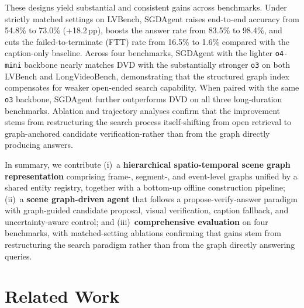 \documentclass[sigconf, screen, review, anonymous]{acmart}
\begin{document}

These designs yield substantial and consistent gains across benchmarks.
Under strictly matched settings on LVBench\cite{lvbench}, SGDAgent raises end-to-end accuracy from 54.8\% to 73.0\% (+18.2\,pp), boosts the answer rate from 83.5\% to 98.4\%, and cuts the failed-to-terminate (FTT) rate from 16.5\% to 1.6\% compared with the caption-only baseline.  Across four benchmarks, SGDAgent with the lighter \texttt{o4-mini} backbone nearly matches DVD\cite{deepvideo2025} with the substantially stronger \texttt{o3} on both LVBench and LongVideoBench\cite{longvideobench2024}, demonstrating that the structured graph index compensates for weaker open-ended search capability. When paired with the same \texttt{o3} backbone, SGDAgent further outperforms DVD on all three long-duration benchmarks.  Ablation and trajectory analyses confirm that the improvement stems from restructuring the search process itself-shifting from open retrieval to graph-anchored candidate verification-rather than from the graph directly producing answers.


In summary, we contribute (i)~a \textbf{hierarchical spatio-temporal scene
graph representation} comprising frame-, segment-, and event-level graphs unified by a
shared entity registry, together with a bottom-up offline construction
pipeline; (ii)~a \textbf{scene graph-driven agent} that follows a
propose-verify-answer paradigm with graph-guided candidate proposal,
visual verification, caption fallback, and uncertainty-aware control; and
(iii)~\textbf{comprehensive evaluation} on four benchmarks, with
matched-setting ablations confirming that gains stem from restructuring
the search paradigm rather than from the graph directly answering queries.

\section{Related Work}
\label{sec:related}
\end{document}
